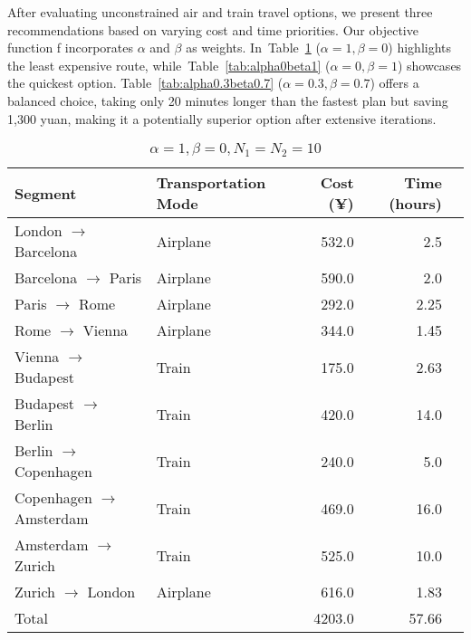\documentclass{article} %
\begin{document}
After evaluating unconstrained air and train travel options, we present three recommendations based on varying cost and time priorities. Our objective function f incorporates $\alpha$ and $\beta$ as weights. In~Table~\ref{tab:alpha1beta0} ($\alpha = 1, \beta = 0$) highlights the least expensive route, while~Table~\ref{tab:alpha0beta1} ($\alpha = 0, \beta = 1$) showcases the quickest option. Table~\ref{tab:alpha0.3beta0.7} ($\alpha = 0.3, \beta = 0.7$) offers a balanced choice, taking only 20 minutes longer than the fastest plan but saving 1,300 yuan, making it a potentially superior option after extensive iterations.

\begin{table}[!ht]
  \centering
  \begin{tabular}{llrrr}
    \toprule
    Segment                          & Transportation Mode & Cost (¥) & Time (hours) \\
    \midrule
    London $\rightarrow$  Barcelona  & Airplane            & 532.0    & 2.5          \\
    Barcelona $\rightarrow$  Paris   & Airplane            & 590.0    & 2.0          \\
    Paris $\rightarrow$  Rome        & Airplane            & 292.0    & 2.25         \\
    Rome $\rightarrow$  Vienna       & Airplane            & 344.0    & 1.45         \\
    Vienna $\rightarrow$  Budapest   & Train               & 175.0    & 2.63         \\
    Budapest $\rightarrow$  Berlin   & Train               & 420.0    & 14.0         \\
    Berlin $\rightarrow$  Copenhagen & Train               & 240.0    & 5.0          \\
    Copenhagen $\rightarrow$  Amsterdam & Train            & 469.0    & 16.0         \\
    Amsterdam $\rightarrow$  Zurich  & Train               & 525.0    & 10.0         \\
    Zurich $\rightarrow$  London     & Airplane            & 616.0    & 1.83         \\
    \midrule
    Total                            &                     & 4203.0   & 57.66         \\
    \bottomrule
  \end{tabular}
  \caption{$\alpha=1, \beta=0, N_1=N_2=10$}%
  \label{tab:alpha1beta0}
\end{table}
\end{document}
